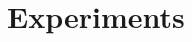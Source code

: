 \documentclass[10pt,twocolumn,letterpaper]{article}
\begin{document}
\raggedbottom
\setcounter{section}{3}
\section{Experiments}

{\small


}
\end{document}
